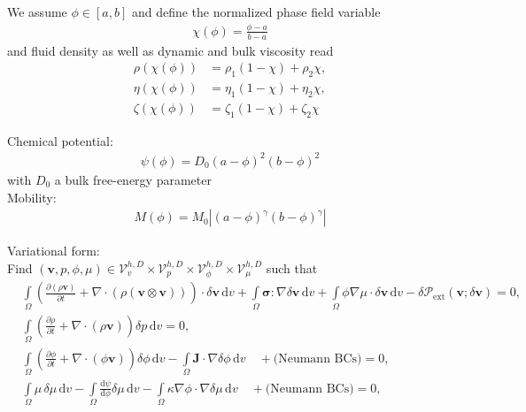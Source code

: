 \documentclass[a4paper,12pt]{report}
\newcommand{\Om}{\mathit{\Omega}}
\begin{document}
We assume $\phi \in [a, b]$ and define the normalized phase field variable
\begin{align}
\chi(\phi) = \frac{\phi-a}{b-a}
\end{align}
and fluid density as well as dynamic and bulk viscosity read
\begin{align}
\rho(\chi(\phi)) &= \rho_1 (1 - \chi) + \rho_2 \chi, \\
\eta(\chi(\phi)) &= \eta_1 (1 - \chi) + \eta_2 \chi, \\
\zeta(\chi(\phi)) &= \zeta_1 (1 - \chi) + \zeta_2 \chi
\end{align}

Chemical potential:
\begin{align}
\psi(\phi) = D_0 (a-\phi)^2 (b-\phi)^2
\end{align}
with $D_0$ a bulk free-energy parameter\\

Mobility:
\begin{align}
M(\phi) = M_0 |(a-\phi)^{\gamma} (b-\phi)^{\gamma}| \label{equation-mobility}
\end{align}

Variational form:\\

Find $(\boldsymbol{v},p,\phi,\mu) \in \boldsymbol{\mathcal{V}}_{v}^{h,D} \times \mathcal{V}_{p}^{h,D} \times \mathcal{V}_{\phi}^{h,D} \times \mathcal{V}_{\mu}^{h,D}$ such that
\begin{equation}
\begin{aligned}
&\int\limits_{\Om} \left(\frac{\partial(\rho\boldsymbol{v})}{\partial t} + \nabla\cdot(\rho(\boldsymbol{v}\otimes\boldsymbol{v}))\right) \cdot \delta\boldsymbol{v} \,\mathrm{d}v + \int\limits_{\Omega}\boldsymbol{\sigma} : \nabla\delta\boldsymbol{v}\,\mathrm{d}v + \int\limits_{\Omega}\phi \nabla\mu\cdot\delta\boldsymbol{v}\,\mathrm{d}v - \delta\mathcal{P}_{\mathrm{ext}}(\boldsymbol{v};\delta\boldsymbol{v}) = 0, \\
&\int\limits_{\Om}\left(\frac{\partial\rho}{\partial t} + \nabla\cdot(\rho\boldsymbol{v})\right)\delta p \,\mathrm{d}v = 0, \\
&\int\limits_{\Om} \left(\frac{\partial \phi}{\partial t} + \nabla\cdot(\phi\boldsymbol{v})\right) \delta \phi \, \mathrm{d}v - \int\limits_{\Omega} \boldsymbol{J} \cdot \nabla \delta \phi \, \mathrm{d}v \quad + \text{(Neumann BCs)} = 0, \\
&\int\limits_{\Om} \mu \,\delta\mu \, \mathrm{d}v - \int\limits_{\Omega} \frac{\mathrm{d}\psi}{\mathrm{d}\phi} \delta\mu \,\mathrm{d}v - \int\limits_{\Omega} \kappa \nabla \phi \cdot \nabla \delta\mu \, \mathrm{d}v \quad + \text{(Neumann BCs)} = 0,
\end{aligned}
\end{equation}
\end{document}
